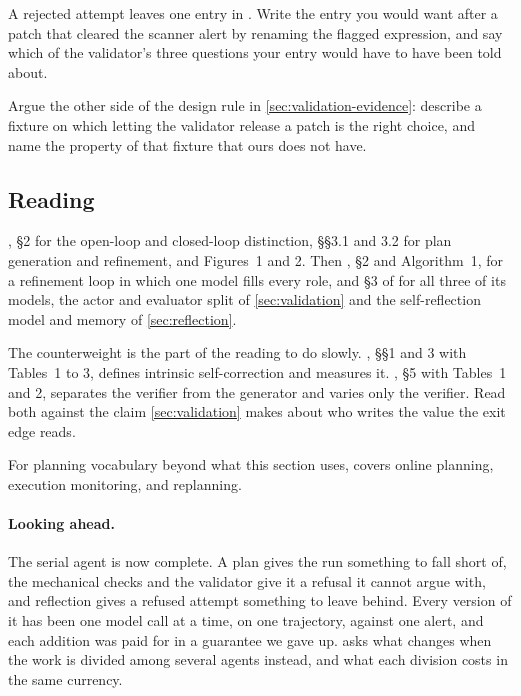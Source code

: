 \item A rejected attempt leaves one entry in . Write the entry you would want
after a patch that cleared the scanner alert by renaming the flagged expression, and say which of
the validator's three questions your entry would have to have been told about.

\item Argue the other side of the design rule in \cref{sec:validation-evidence}: describe a fixture
on which letting the validator release a patch is the right choice, and name the property of that
fixture that ours does not have.

\ee

\subsection{Reading}

\citet{sun2023adaplanner}, \S2 for the open-loop and closed-loop distinction, \S\S3.1
and 3.2 for plan generation and refinement, and Figures~1 and 2. Then
\citet{madaan2023selfrefine}, \S2 and Algorithm~1, for a refinement loop in which one model fills
every role, and \S3 of \citet{shinn2023reflexion} for all three of its models, the actor and
evaluator split of \cref{sec:validation} and the self-reflection model and memory of
\cref{sec:reflection}.

The counterweight is the part of the reading to do slowly. \citet{huang2024selfcorrect}, \S\S1 and 3
with Tables~1 to 3, defines intrinsic self-correction and measures it. \citet{stechly2025selfverification},
\S5 with Tables~1 and 2, separates the verifier from the generator and varies only the verifier.
Read both against the claim \cref{sec:validation} makes about who writes the value the exit edge
reads.

For planning vocabulary beyond what this section uses, \citet[\S11.5.3]{russell2020aima} covers
online planning, execution monitoring, and replanning.

\paragraph{Looking ahead.}
The serial agent is now complete. A plan gives the run something to fall short of, the mechanical
checks and the validator give it a refusal it cannot argue with, and reflection gives a refused
attempt something to leave behind. Every version of it has been one model call at a time, on one
trajectory, against one alert, and each addition was paid for in a guarantee we gave up.
 asks what changes when the work is divided among several agents instead, and
what each division costs in the same currency.

